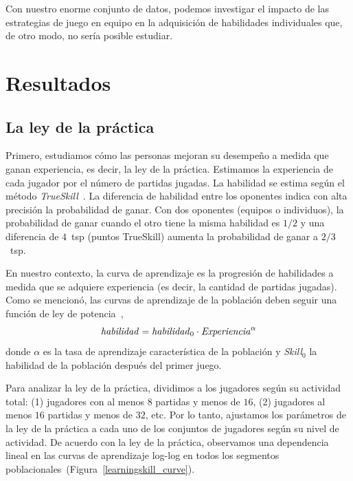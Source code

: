 \documentclass[a4paper,11pt]{book}
\theoremstyle{definition}
\begin{document}
Con nuestro enorme conjunto de datos, podemos investigar el impacto de las estrategias de juego en equipo en la adquisición de habilidades individuales que, de otro modo, no sería posible estudiar.

\section{Resultados}

\subsection{La ley de la práctica}

Primero, estudiamos cómo las personas mejoran su desempeño a medida que ganan experiencia, es decir, la ley de la práctica.
%
Estimamos la experiencia de cada jugador por el número de partidas jugadas.
%
La habilidad se estima según el método \emph{TrueSkill}~\cite{Herbrich2007}.
%
La diferencia de habilidad entre los oponentes indica con alta precisión la probabilidad de ganar.
%
Con dos oponentes (equipos o individuos), la probabilidad de ganar cuando el otro tiene la misma habilidad es $1/2$ y una diferencia de $4$~tsp (puntos TrueSkill) aumenta la probabilidad de ganar a $2/3$~tsp.


En nuestro contexto, la curva de aprendizaje es la progresión de habilidades a medida que se adquiere experiencia (es decir, la cantidad de partidas jugadas).
%
Como se mencionó, las curvas de aprendizaje de la población deben seguir una función de ley de potencia~\cite{Newell1981},
%
\begin{equation}\label{lawOfPractice}
   \text{\emph{habilidad}} = \text{\emph{habilidad}}_0 \cdot \text{\emph{Experiencia}}^{\alpha}
\end{equation}
%
donde $\alpha$ es la tasa de aprendizaje característica de la población y \emph{Skill}$_0$ la habilidad de la población después del primer juego.


Para analizar la ley de la práctica, dividimos a los jugadores según su actividad total: (1) jugadores con al menos $8$ partidas y menos de $16$, (2) jugadores al menos $16$ partidas y menos de $32$, etc.
%
Por lo tanto, ajustamos los parámetros de la ley de la práctica a cada uno de los conjuntos de jugadores según su nivel de actividad.
%
De acuerdo con la ley de la práctica, observamos una dependencia lineal en las curvas de aprendizaje log-log en todos los segmentos poblacionales~(Figura~\ref{learningskill_curve}).
\end{document}
